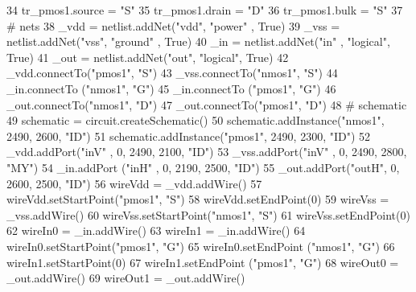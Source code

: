 \begin{DoxyCodeInclude}
34 tr\_pmos1.source = \textcolor{stringliteral}{"S"}
35 tr\_pmos1.drain  = \textcolor{stringliteral}{"D"}
36 tr\_pmos1.bulk   = \textcolor{stringliteral}{"S"}
37 \textcolor{comment}{#  nets}
38 \_vdd = netlist.addNet(\textcolor{stringliteral}{"vdd"}, \textcolor{stringliteral}{"power"}  , \textcolor{keyword}{True})
39 \_vss = netlist.addNet(\textcolor{stringliteral}{"vss"}, \textcolor{stringliteral}{"ground"} , \textcolor{keyword}{True})
40 \_in  = netlist.addNet(\textcolor{stringliteral}{"in"} , \textcolor{stringliteral}{"logical"}, \textcolor{keyword}{True})
41 \_out = netlist.addNet(\textcolor{stringliteral}{"out"}, \textcolor{stringliteral}{"logical"}, \textcolor{keyword}{True})
42 \_vdd.connectTo(\textcolor{stringliteral}{"pmos1"}, \textcolor{stringliteral}{"S"})
43 \_vss.connectTo(\textcolor{stringliteral}{"nmos1"}, \textcolor{stringliteral}{"S"})
44 \_in.connectTo (\textcolor{stringliteral}{"nmos1"}, \textcolor{stringliteral}{"G"})
45 \_in.connectTo (\textcolor{stringliteral}{"pmos1"}, \textcolor{stringliteral}{"G"})
46 \_out.connectTo(\textcolor{stringliteral}{"nmos1"}, \textcolor{stringliteral}{"D"})
47 \_out.connectTo(\textcolor{stringliteral}{"pmos1"}, \textcolor{stringliteral}{"D"})
48 \textcolor{comment}{# schematic}
49 schematic = circuit.createSchematic()
50 schematic.addInstance(\textcolor{stringliteral}{"nmos1"}, 2490, 2600, \textcolor{stringliteral}{"ID"})
51 schematic.addInstance(\textcolor{stringliteral}{"pmos1"}, 2490, 2300, \textcolor{stringliteral}{"ID"})
52 \_vdd.addPort(\textcolor{stringliteral}{"inV"} , 0, 2490, 2100, \textcolor{stringliteral}{"ID"})
53 \_vss.addPort(\textcolor{stringliteral}{"inV"} , 0, 2490, 2800, \textcolor{stringliteral}{"MY"})
54 \_in.addPort (\textcolor{stringliteral}{"inH"} , 0, 2190, 2500, \textcolor{stringliteral}{"ID"})
55 \_out.addPort(\textcolor{stringliteral}{"outH"}, 0, 2600, 2500, \textcolor{stringliteral}{"ID"})
56 wireVdd = \_vdd.addWire()
57 wireVdd.setStartPoint(\textcolor{stringliteral}{"pmos1"}, \textcolor{stringliteral}{"S"})
58 wireVdd.setEndPoint(0)
59 wireVss = \_vss.addWire()
60 wireVss.setStartPoint(\textcolor{stringliteral}{"nmos1"}, \textcolor{stringliteral}{"S"})
61 wireVss.setEndPoint(0)
62 wireIn0 = \_in.addWire()
63 wireIn1 = \_in.addWire()
64 wireIn0.setStartPoint(\textcolor{stringliteral}{"pmos1"}, \textcolor{stringliteral}{"G"})
65 wireIn0.setEndPoint  (\textcolor{stringliteral}{"nmos1"}, \textcolor{stringliteral}{"G"})
66 wireIn1.setStartPoint(0)
67 wireIn1.setEndPoint  (\textcolor{stringliteral}{"pmos1"}, \textcolor{stringliteral}{"G"})
68 wireOut0 = \_out.addWire()
69 wireOut1 = \_out.addWire()

\end{DoxyCodeInclude}
